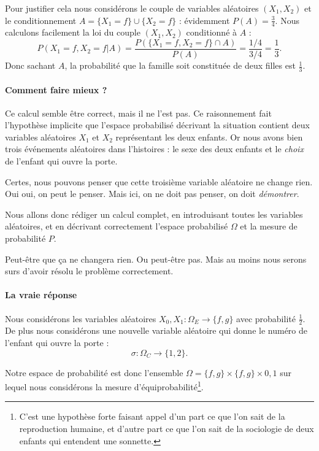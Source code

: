 Pour justifier cela nous considérons le couple de variables aléatoires \( \left( X_1,X_2 \right)\) et le conditionnement \( A=\{ X_1=f \}\cup\{ X_2=f \}\) : évidemment \( P(A)=\frac{ 3 }{ 4 }\). Nous calculons facilement la loi du couple \( (X_1,X_2)\) conditionné à \( A\) :
\begin{equation}
	P(X_1=f,X_2=f|A)=\frac{ P(  \{ X_1=f,X_2=f \}\cap A  ) }{ P(A) }=\frac{ 1/4 }{ 3/4 }=\frac{1}{ 3 }.
\end{equation}
Donc sachant \( A\), la probabilité que la famille soit constituée de deux filles est \( \frac{1}{ 3 }\).

\paragraph{Comment faire mieux ?}

Ce calcul semble être correct, mais il ne l'est pas. Ce raisonnement fait l'hypothèse implicite que l'espace probabilisé décrivant la situation contient deux variables aléatoires \( X_1\) et \( X_2\) représentant les deux enfants. Or nous avons bien trois événements aléatoires dans l'histoires : le sexe des deux enfants et le \emph{choix} de l'enfant qui ouvre la porte.

Certes, nous pouvons penser que cette troisième variable aléatoire ne change rien. Oui oui, on peut le penser. Mais ici, on ne doit pas penser, on doit \emph{démontrer}.

Nous allons donc rédiger un calcul complet, en introduisant toutes les variables aléatoires, et en décrivant correctement l'espace probabilisé \( \Omega\) et la mesure de probabilité \( P\).

Peut-être que ça ne changera rien. Ou peut-être pas. Mais au moins nous serons surs d'avoir résolu le problème correctement.

\paragraph{La vraie réponse}

Nous considérons les variables aléatoires \( X_0,X_1\colon \Omega_E\to \{ f,g \}\) avec probabilité \( \frac{ 1 }{2}\). De plus nous considérons une nouvelle variable aléatoire qui donne le numéro de l'enfant qui ouvre la porte :
\begin{equation}
	\sigma\colon \Omega_C\to \{ 1,2 \}.
\end{equation}

Notre espace de probabilité est donc l'ensemble \( \Omega=\{ f,g \}\times \{ f,g \}\times {0,1}\) sur lequel nous considérons la mesure d'équiprobabilité\footnote{C'est une hypothèse forte faisant appel d'un part ce que l'on sait de la reproduction humaine, et d'autre part ce que l'on sait de la sociologie de deux enfants qui entendent une sonnette.}.

